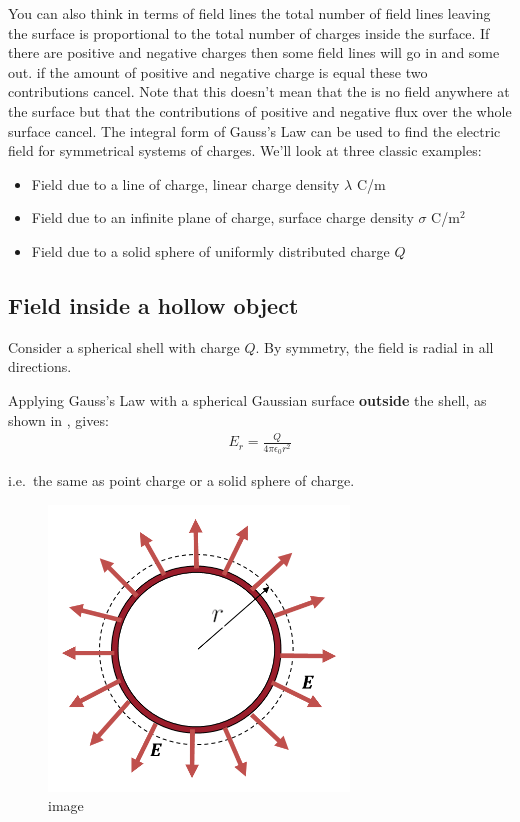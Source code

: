 \documentclass[
]{book}
\begin{document}
You can also think in terms of field lines the total number of field
lines leaving the surface is proportional to the total number of charges
inside the surface. If there are positive and negative charges then some
field lines will go in and some out. if the amount of positive and
negative charge is equal these two contributions cancel. Note that this
doesn't mean that the is no field anywhere at the surface but that the
contributions of positive and negative flux over the whole surface
cancel. The integral form of Gauss's Law can be used to find the
electric field for symmetrical systems of charges. We'll look at three
classic examples:

\begin{itemize}
\item
  Field due to a line of charge, linear charge density \(\lambda\) C/m
\item
  Field due to an infinite plane of charge, surface charge density
  \(\sigma\) C/m\(^2\)
\item
  Field due to a solid sphere of uniformly distributed charge \(Q\)
\end{itemize}

\hypertarget{field-inside-a-hollow-object}{%
\subsection{Field inside a hollow object}\label{field-inside-a-hollow-object}}

Consider a spherical shell with charge \(Q\). By symmetry, the field is
radial in all directions.

Applying Gauss's Law with a spherical Gaussian surface \textbf{outside} the
shell, as shown in , gives: \[\begin{aligned}
E_r = \frac{Q}{4\pi\epsilon_0 r^2} 
\end{aligned}\]

i.e.~the same as point charge or a solid sphere of charge.

\begin{figure}
\centering
\includegraphics[width=80mm,height=\textheight]{Figures/GaussOutsideShell.png}
\caption{image}
\end{figure}
\end{document}
